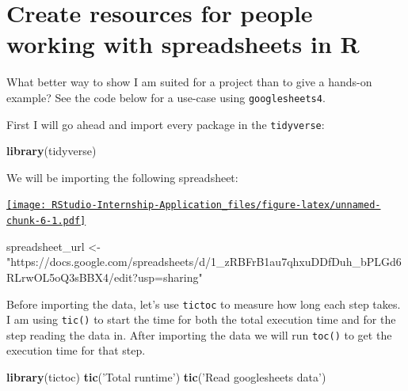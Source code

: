 \documentclass[
]{book}
\newenvironment{Shaded}{\begin{snugshade}}{\end{snugshade}}
\newcommand{\KeywordTok}[1]{\textcolor[rgb]{0.13,0.29,0.53}{\textbf{#1}}}
\newcommand{\NormalTok}[1]{#1}
\newcommand{\StringTok}[1]{\textcolor[rgb]{0.31,0.60,0.02}{#1}}
\begin{document}
\hypertarget{create-resources-for-people-working-with-spreadsheets-in-r}{%
\section{Create resources for people working with spreadsheets in R}\label{create-resources-for-people-working-with-spreadsheets-in-r}}

What better way to show I am suited for a project than to give a hands-on example? See the code below for a use-case using \texttt{googlesheets4}\citep{R-googlesheets4}.

First I will go ahead and import every package in the \texttt{tidyverse}\citep{R-tidyverse}:

\begin{Shaded}
\begin{Highlighting}[]
\KeywordTok{library}\NormalTok{(tidyverse)}
\end{Highlighting}
\end{Shaded}

We will be importing the following spreadsheet:

\href{https://docs.google.com/spreadsheets/d/1_zRBFrB1au7qhxuDDfDuh_bPLGd6RLrwOL5oQ3sBBX4/edit\#gid=395468559}{\texttt{[image: RStudio-Internship-Application\_files/figure-latex/unnamed-chunk-6-1.pdf]}}

\begin{Shaded}
\begin{Highlighting}[]
\NormalTok{spreadsheet_url <-}\StringTok{ "https://docs.google.com/spreadsheets/d/1_zRBFrB1au7qhxuDDfDuh_bPLGd6RLrwOL5oQ3sBBX4/edit?usp=sharing"}
\end{Highlighting}
\end{Shaded}

Before importing the data, let's use \texttt{tictoc} \citep{R-tictoc} to measure how long each step takes. I am using \texttt{tic()} to start the time for both the total execution time and for the step reading the data in. After importing the data we will run \texttt{toc()} to get the execution time for that step.

\begin{Shaded}
\begin{Highlighting}[]
\KeywordTok{library}\NormalTok{(tictoc)}
\KeywordTok{tic}\NormalTok{(}\StringTok{'Total runtime'}\NormalTok{)}
\KeywordTok{tic}\NormalTok{(}\StringTok{'Read googlesheets data'}\NormalTok{)}
\end{Highlighting}
\end{Shaded}
\end{document}
